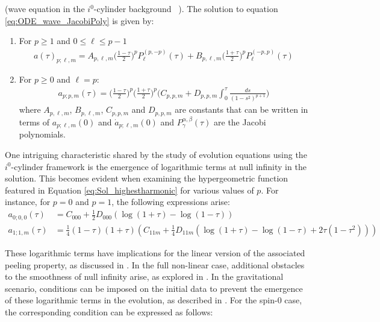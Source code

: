 \begin{lemma} (wave equation in the $i^0$-cylinder
  background~ \cite{MinMacKro22})\label{Lemma:Sol_Jacobi_and_Logs}. The solution to equation \eqref{eq:ODE_wave_JacobiPoly} is given
  by:
	\begin{enumerate}
	\item For $p\geq 1$ and $0\leq \ell \leq p-1$
	 \begin{align}\label{eq:Sol_jac_poly}
    a(\tau)_{p;\ell,m} =A_{p,\ell,m}
		  \bigg(\frac{1-\tau}{2}\bigg)^{p}
                  P_{\ell}^{(p,-p)}(\tau) + B_{p,\ell,m}
                  \bigg(\frac{1+\tau}{2}\bigg)^{p}P_{\ell}^{(-p,p)}(\tau)
	 \end{align}
	
	\item For $p\geq 0$ and $\ell=p$:
     \begin{align}\label{eq:Sol_highestharmonic}
      {a}_{p;p,m}(\tau) =
      \bigg(\frac{1-\tau}{2}\bigg)^{p}\bigg(\frac{1+\tau}{2}\bigg)^{p}\Bigg(C_{p,p,m}
      +D_{p,p,m}\int_{0}^{\tau} \frac{ds}{(1-s^2)^{p+1}}\Bigg)
     \end{align}
	where $A_{p,\ell,m}$, $B_{p,\ell,m}$, $C_{p,p,m}$ and
        $D_{p,p,m}$ are constants that can be written in terms of
        $a_{p;\ell,m}(0)$ and $\dot{a}_{p;\ell,m}(0)$ and
        $P_{\gamma}^{\alpha, \beta}(\tau)$ are the Jacobi polynomials.
    \end{enumerate}
\end{lemma}

One intriguing characteristic shared by the study of evolution equations using the $i^0$-cylinder framework is the emergence of logarithmic terms at null infinity in the solution. This becomes evident when examining the hypergeometric function featured in Equation \eqref{eq:Sol_highestharmonic} for various values of $p$. For instance, for $p = 0$ and $p = 1$, the following expressions arise:
\begin{align}
  {a}_{0;0,0}(\tau) & = C_{000} + \tfrac{1}{2} D_{000} (\log(1 + \tau
  )- \log(1 - \tau ))\\ {a}_{1;1,m}(\tau) & = \tfrac{1}{4} (1 - \tau )
  (1 + \tau ) (C_{11m} + \tfrac{1}{4} D_{11m} ( \log(1 + \tau ) -
  \log(1 - \tau ) + 2\tau(1-\tau^2)))
\end{align}

These logarithmic terms have implications for the linear version of the associated peeling property, as discussed in \cite{Val07,MinMacKro22}. In the full non-linear case, additional obstacles to the smoothness of null infinity arise, as explored in \cite{Val04}. In the gravitational scenario, conditions can be imposed on the initial data to prevent the emergence of these logarithmic terms in the evolution, as described in \cite{Fri98a}. For the spin-0 case, the corresponding condition can be expressed as follows:


